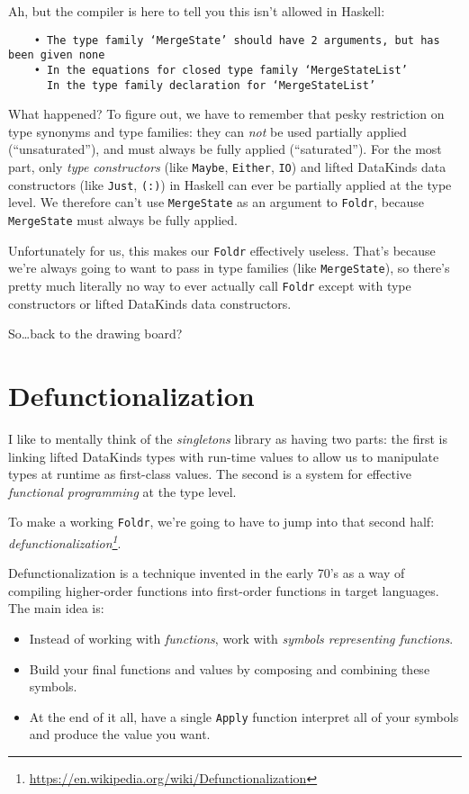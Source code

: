 \documentclass[]{article}
\renewcommand{\href}[2]{#2\footnote{\url{#1}}}
\begin{document}
Ah, but the compiler is here to tell you this isn't allowed in Haskell:

\begin{verbatim}
    • The type family ‘MergeState’ should have 2 arguments, but has been given none
    • In the equations for closed type family ‘MergeStateList’
      In the type family declaration for ‘MergeStateList’
\end{verbatim}

What happened? To figure out, we have to remember that pesky restriction on type
synonyms and type families: they can \emph{not} be used partially applied
(``unsaturated''), and must always be fully applied (``saturated''). For the
most part, only \emph{type constructors} (like \texttt{Maybe}, \texttt{Either},
\texttt{IO}) and lifted DataKinds data constructors (like
\texttt{\textquotesingle{}Just}, \texttt{\textquotesingle{}(:)}) in Haskell can
ever be partially applied at the type level. We therefore can't use
\texttt{MergeState} as an argument to \texttt{Foldr}, because
\texttt{MergeState} must always be fully applied.

Unfortunately for us, this makes our \texttt{Foldr} effectively useless. That's
because we're always going to want to pass in type families (like
\texttt{MergeState}), so there's pretty much literally no way to ever actually
call \texttt{Foldr} except with type constructors or lifted DataKinds data
constructors.

So\ldots back to the drawing board?

\section{Defunctionalization}\label{defunctionalization}

I like to mentally think of the \emph{singletons} library as having two parts:
the first is linking lifted DataKinds types with run-time values to allow us to
manipulate types at runtime as first-class values. The second is a system for
effective \emph{functional programming} at the type level.

To make a working \texttt{Foldr}, we're going to have to jump into that second
half:
\emph{\href{https://en.wikipedia.org/wiki/Defunctionalization}{defunctionalization}}.

Defunctionalization is a technique invented in the early 70's as a way of
compiling higher-order functions into first-order functions in target languages.
The main idea is:

\begin{itemize}
\tightlist
\item
  Instead of working with \emph{functions}, work with \emph{symbols representing
  functions}.
\item
  Build your final functions and values by composing and combining these
  symbols.
\item
  At the end of it all, have a single \texttt{Apply} function interpret all of
  your symbols and produce the value you want.
\end{itemize}
\end{document}
